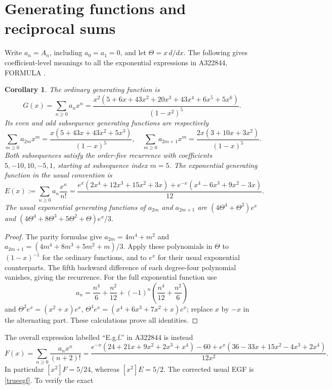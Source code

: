 \documentclass[11pt]{article}
\newtheorem{corollary}[theorem]{Corollary}
\begin{document}
\section{Generating functions and reciprocal sums}\label{generating}
Write $a_n=A_n$, including $a_0=a_1=0$, and let
$\Theta=x\,d/dx$. The following gives coefficient-level meanings to all
the exponential expressions in A322844, FORMULA \cite{posing}.

\begin{corollary}\label{gf}
The ordinary generating function is
\[
 G(x)=\sum_{n\geq0}a_nx^n=
 \frac{x^2(5+6x+43x^2+20x^3+43x^4+6x^5+5x^6)}{(1-x^2)^5}.
\]
Its even and odd subsequence generating functions are respectively
\[
 \sum_{m\geq0}a_{2m}x^m=\frac{x(5+43x+43x^2+5x^3)}{(1-x)^5},\quad
 \sum_{m\geq0}a_{2m+1}x^m=\frac{2x(3+10x+3x^2)}{(1-x)^5}.
\]
Both subsequences satisfy the order-five recurrence with coefficients
$5,-10,10,-5,1$, starting at subsequence index $m=5$.
The exponential generating function in the usual convention is
\begin{equation}\label{trueegf}
 E(x):=\sum_{n\geq0}a_n\frac{x^n}{n!}
 =\frac{e^x(2x^4+12x^3+15x^2+3x)
       +e^{-x}(x^4-6x^3+9x^2-3x)}{12}.
\end{equation}
The usual exponential generating functions of $a_{2m}$ and $a_{2m+1}$
are $(4\Theta^4+\Theta^2)e^x$ and
$(4\Theta^4+8\Theta^3+5\Theta^2+\Theta)e^x/3$.
\end{corollary}
\begin{proof}
The parity formulas give $a_{2m}=4m^4+m^2$ and
$a_{2m+1}=(4m^4+8m^3+5m^2+m)/3$.
Apply these polynomials in $\Theta$ to $(1-x)^{-1}$ for the ordinary
functions, and to $e^x$ for their usual exponential counterparts.
The fifth backward difference of each degree-four polynomial vanishes,
giving the recurrence. For the full exponential function use
\[
 a_n=\frac{n^4}{6}+\frac{n^2}{12}
       +(-1)^n\left(\frac{n^4}{12}+\frac{n^2}{6}\right)
\]
and $\Theta^2e^x=(x^2+x)e^x$,
$\Theta^4e^x=(x^4+6x^3+7x^2+x)e^x$; replace $x$ by $-x$
in the alternating part. These calculations prove all identities.
\end{proof}
The overall expression labelled ``E.g.f.'' in A322844 is instead
\begin{equation}\label{shifted}
 F(x)=\sum_{n\geq0}\frac{a_nx^n}{(n+2)!}
 =\frac{e^{-x}(24+21x+9x^2+2x^3+x^4)-60
       +e^x(36-33x+15x^2-4x^3+2x^4)}{12x^2}.
\end{equation}
In particular $[x^2]F=5/24$, whereas $[x^2]E=5/2$.
The corrected usual EGF is \eqref{trueegf}. To verify the exact
\end{document}
